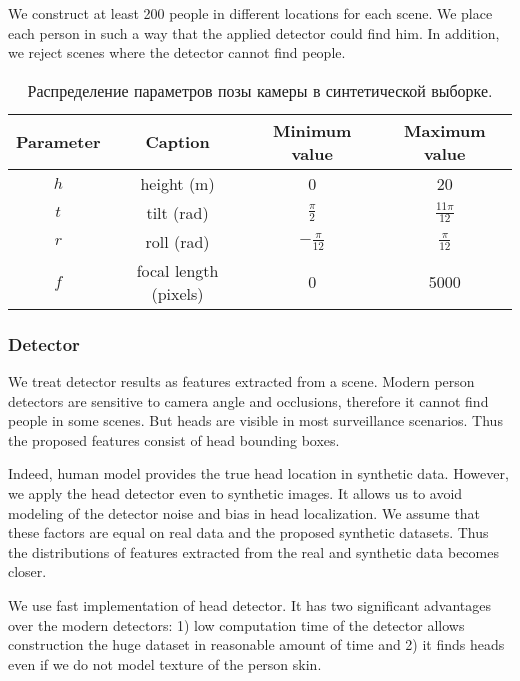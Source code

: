 We construct at least 200 people in different locations for each scene. We place each person in such a way that the applied detector could find him. In addition, we reject scenes where the detector cannot find people.

\begin{table} [htbp]
	\centering
	\captionsetup{width=15cm}
	\caption{Распределение параметров позы камеры в синтетической выборке.}\label{tab:params}%
	\begin{tabular}{|c|c|c|c|}
		\hline
		Parameter & Caption & Minimum value & Maximum value\\
		\hline
		\hline
		$h$ & height (m) & 0 & 20 \\
		$t$ & tilt (rad) & $\frac{\pi}{2}$ & $\frac{11\pi}{12}$ \\
		$r$ & roll (rad) & $-\frac{\pi}{12}$ & $\frac{\pi}{12}$ \\
		$f$ & focal length (pixels) & 0 & 5000 \\
		\hline
	\end{tabular}
\end{table}

\subsubsection{Detector}

\noindent We treat detector results as features extracted from a scene.
Modern person detectors are sensitive to camera angle and occlusions, therefore it cannot find people in some scenes. But heads are visible in most surveillance scenarios. Thus the proposed features consist of head bounding boxes.

Indeed, human model \cite{pishchulin2015building} provides the true head location in synthetic data. However, we apply the head detector even to synthetic images. It allows us to avoid modeling of the detector noise and bias in head localization. We assume that these factors are equal on real data and the proposed synthetic datasets. Thus the distributions of features extracted from the real and synthetic data becomes closer.

We use fast implementation \cite{prisacariu2009fasthog} of head detector. It has two significant advantages over the modern detectors: 1) low computation time of the detector allows construction the huge dataset in reasonable amount of time and 2) it finds heads even if we do not model texture of the person skin.


